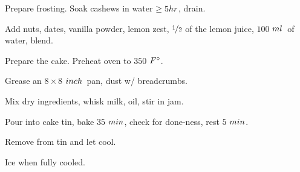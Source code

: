 \begin{preparation}
\item Prepare frosting.
	Soak cashews in water $\ge5\hour$, drain.
\item Add nuts, dates, vanilla powder, lemon zest, $\onehalf$ of the lemon juice, $100$ $\ml$~of water, blend.
\item Prepare the cake.
	Preheat oven to $350$ $\Fahrenheit$.
\item Grease an $8\times8$ $\inch$~pan, dust w/ breadcrumbs.
\item Mix dry ingredients, whisk milk, oil, stir in jam.
\item Pour into cake tin, bake $35$ $\minute$, check for done-ness, rest $5$ $\minute$.
\item Remove from tin and let cool.
\item Ice when fully cooled.
\end{preparation}


\recipeend%
